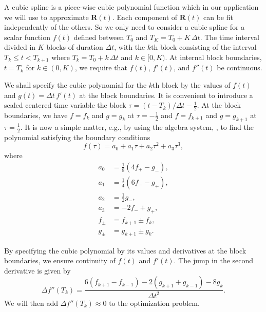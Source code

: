 \documentclass
[rmp,reprint,
twocolumn,amsmath,showkeys,letterpaper,raggedbottom]{revtex4-2}
\begin{document}
A cubic spline is a piece-wise cubic polynomial function which in our
application we will use to approximate $\mathbf R(t)$.  Each component
of $\mathbf R(t)$ can be fit independently of the others.  So we only
need to consider a cubic spline for a scalar function $f(t)$ defined
between $T_0$ and $T_K = T_0 + K \,\Delta t$.  The time interval divided
in $K$ blocks of duration $\Delta t$, with the $k\text{th}$ block
consisting of the interval $T_k \le t < T_{k+1}$ where $T_k = T_0 + k
\,\Delta t$ and $k \in [0,K)$.  At internal block boundaries, $t = T_k$
for $k \in (0, K)$, we require that $f(t)$, $f'(t)$, and $f''(t)$ be
continuous.

We shall specify the cubic polynomial for the $k\text{th}$ block
by the values of $f(t)$ and $g(t) = \Delta t\,f'(t)$ at the block
boundaries.  It is convenient to introduce a scaled centered time
variable the block $\tau = (t - T_k)/\Delta t - \frac12$.  At the
block boundaries, we have $f = f_k$ and $g = g_k$ at $\tau =
-\frac12$ and $f = f_{k+1}$ and $g = g_{k+1}$ at $\tau =
\frac12$.  It is now a simple matter, e.g., by using the algebra
system, \citet{maxima}, to find the polynomial satisfying the boundary
conditions
\begin{equation}
f(\tau) = a_0 + a_1 \tau + a_2 \tau^2 + a_3 \tau^3,
\end{equation}
where
\begin{align*}
 a_0 &= \textstyle\frac18 (4 f_+ - g_-),\\
 a_1 &= \textstyle\frac14 (6 f_- - g_+),\\
 a_2 &= \textstyle\frac12 g_-,\\
 a_3 &= -2 f_- + g_+,\\
 f_\pm &= f_{k+1} \pm f_k, \\
 g_\pm &= g_{k+1} \pm g_k.
\end{align*}

By specifying the cubic polynomial by its values and derivatives at
the block boundaries, we ensure continuity of $f(t)$ and $f'(t)$.
The jump in the second derivative is given by
\begin{equation}
  \Delta f''(T_k) =
  \frac{6 (f_{k+1}-f_{k-1}) - 2 (g_{k+1}+g_{k-1}) - 8 g_k}
       {\Delta t^2}.
\end{equation}
We will then add $\Delta f''(T_k) \approx 0$ to the optimization problem.
\end{document}
